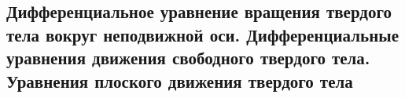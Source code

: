 

\subsection{Дифференциальное уравнение вращения твердого тела вокруг неподвижной оси. Дифференциальные уравнения движения свободного твердого тела. Уравнения плоского движения твердого тела}



